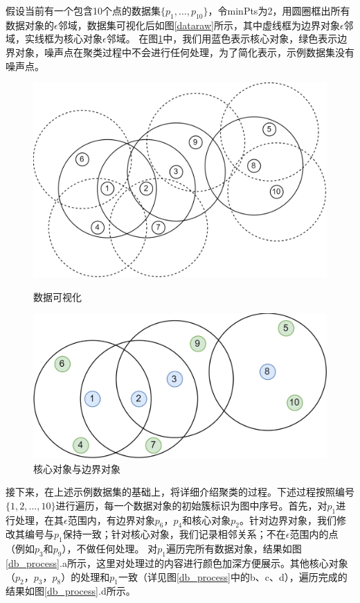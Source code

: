 假设当前有一个包含10个点的数据集$ \{p_1,...,p_{10}\} $，令minPts为2，用圆圈框出所有数据对象的$ \epsilon $邻域，数据集可视化后如图\ref{dataraw}所示，其中虚线框为边界对象$ \epsilon $邻域，实线框为核心对象$ \epsilon $邻域。
在图\ref{dbraw}中，我们用蓝色表示核心对象，绿色表示边界对象，噪声点在聚类过程中不会进行任何处理，为了简化表示，示例数据集没有噪声点。
\begin{figure}[htbp]
	\begin{minipage}[t]{0.48\linewidth}
		\centering
		\includegraphics[width=\linewidth]{img/dbraw.png}
		\caption{数据可视化}
		\label{dataraw}
	\end{minipage}
	\hfill
	\begin{minipage}[t]{0.48\linewidth}
		\centering
		\includegraphics[width=\linewidth]{img/db1.png}
		\caption{核心对象与边界对象}
		\label{dbraw}
	\end{minipage}
\end{figure}

接下来，在上述示例数据集的基础上，将详细介绍聚类的过程。下述过程按照编号$ \{1,2,...,10\} $进行遍历，每一个数据对象的初始簇标识为图中序号。首先，对$ p_1 $进行处理，在其$ \epsilon $范围内，有边界对象$ p_6$，$p_4 $和核心对象$ p_2 $。针对边界对象，我们修改其编号与$ p_1 $保持一致；针对核心对象，我们记录相邻关系；不在$ \epsilon $范围内的点（例如$ p_3 $和$ p_9 $），不做任何处理。
对$ p_1 $遍历完所有数据对象，结果如图\ref{db_process}.a所示，这里对处理过的内容进行颜色加深方便展示。其他核心对象（$ p_2 $，$ p_3 $，$ p_8 $）的处理和$ p_1 $一致（详见图\ref{db_process}中的b、c、d），遍历完成的结果如图\ref{db_process}.d所示。


